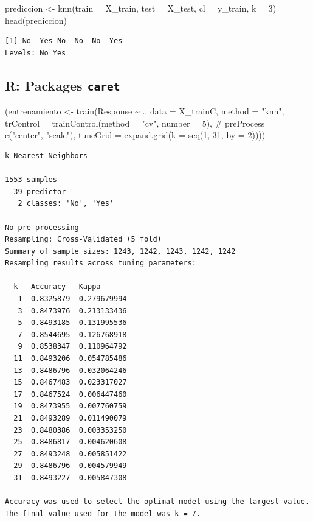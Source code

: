 \documentclass[
  letterpaper,
  DIV=11,
  numbers=noendperiod]{scrartcl}
\newenvironment{Shaded}{\begin{snugshade}}{\end{snugshade}}
\newcommand{\AttributeTok}[1]{\textcolor[rgb]{0.40,0.45,0.13}{#1}}
\newcommand{\CommentTok}[1]{\textcolor[rgb]{0.37,0.37,0.37}{#1}}
\newcommand{\DecValTok}[1]{\textcolor[rgb]{0.68,0.00,0.00}{#1}}
\newcommand{\FunctionTok}[1]{\textcolor[rgb]{0.28,0.35,0.67}{#1}}
\newcommand{\NormalTok}[1]{\textcolor[rgb]{0.00,0.23,0.31}{#1}}
\newcommand{\OtherTok}[1]{\textcolor[rgb]{0.00,0.23,0.31}{#1}}
\newcommand{\SpecialCharTok}[1]{\textcolor[rgb]{0.37,0.37,0.37}{#1}}
\newcommand{\StringTok}[1]{\textcolor[rgb]{0.13,0.47,0.30}{#1}}
\begin{document}
\begin{Shaded}
\begin{Highlighting}[]
\NormalTok{prediccion }\OtherTok{\textless{}{-}} \FunctionTok{knn}\NormalTok{(}\AttributeTok{train =}\NormalTok{ X\_train, }\AttributeTok{test  =}\NormalTok{ X\_test, }\AttributeTok{cl =}\NormalTok{ y\_train, }\AttributeTok{k =} \DecValTok{3}\NormalTok{)}
\FunctionTok{head}\NormalTok{(prediccion)}
\end{Highlighting}
\end{Shaded}

\begin{verbatim}
[1] No  Yes No  No  No  Yes
Levels: No Yes
\end{verbatim}

\subsection{\texorpdfstring{R: Packages
\texttt{caret}}{R: Packages caret}}

\begin{Shaded}
\begin{Highlighting}[]
\NormalTok{(entrenamiento }\OtherTok{\textless{}{-}} \FunctionTok{train}\NormalTok{(Response }\SpecialCharTok{\textasciitilde{}}\NormalTok{ ., }\AttributeTok{data =}\NormalTok{ X\_trainC, }\AttributeTok{method =} \StringTok{"knn"}\NormalTok{,}
                        \AttributeTok{trControl =} \FunctionTok{trainControl}\NormalTok{(}\AttributeTok{method =} \StringTok{"cv"}\NormalTok{, }\AttributeTok{number =} \DecValTok{5}\NormalTok{),}
                        \CommentTok{\# preProcess = c("center", "scale"),}
                        \AttributeTok{tuneGrid =} \FunctionTok{expand.grid}\NormalTok{(}\AttributeTok{k =} \FunctionTok{seq}\NormalTok{(}\DecValTok{1}\NormalTok{, }\DecValTok{31}\NormalTok{, }\AttributeTok{by =} \DecValTok{2}\NormalTok{))))}
\end{Highlighting}
\end{Shaded}

\begin{verbatim}
k-Nearest Neighbors 

1553 samples
  39 predictor
   2 classes: 'No', 'Yes' 

No pre-processing
Resampling: Cross-Validated (5 fold) 
Summary of sample sizes: 1243, 1242, 1243, 1242, 1242 
Resampling results across tuning parameters:

  k   Accuracy   Kappa      
   1  0.8325879  0.279679994
   3  0.8473976  0.213133436
   5  0.8493185  0.131995536
   7  0.8544695  0.126768918
   9  0.8538347  0.110964792
  11  0.8493206  0.054785486
  13  0.8486796  0.032064246
  15  0.8467483  0.023317027
  17  0.8467524  0.006447460
  19  0.8473955  0.007760759
  21  0.8493289  0.011490079
  23  0.8480386  0.003353250
  25  0.8486817  0.004620608
  27  0.8493248  0.005851422
  29  0.8486796  0.004579949
  31  0.8493227  0.005847308

Accuracy was used to select the optimal model using the largest value.
The final value used for the model was k = 7.
\end{verbatim}
\end{document}
